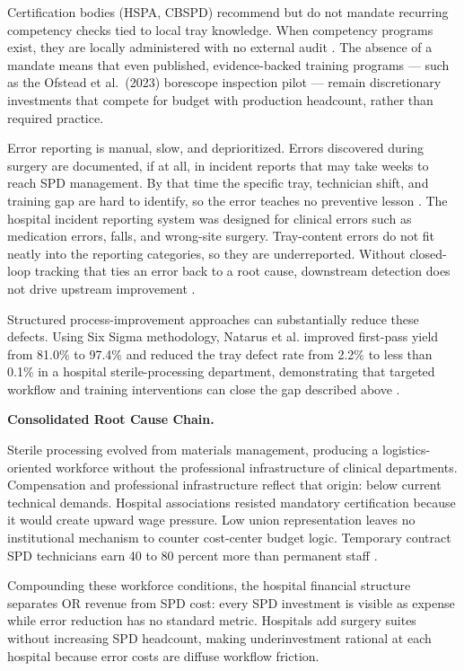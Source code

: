 \documentclass[10pt,a4paper]{article}
\begin{document}
Certification bodies (HSPA, CBSPD) recommend but do not mandate recurring
competency checks tied to local tray knowledge. When competency programs exist,
they are locally administered with no external audit
\cite{kovach-2012, ofstead-et-al-2023}.
The absence of a mandate means that even published, evidence-backed
training programs --- such as the Ofstead et al.\ (2023) borescope
inspection pilot --- remain discretionary investments that compete
for budget with production headcount, rather than required practice.

Error reporting is manual, slow, and deprioritized. Errors discovered during
surgery are documented, if at all, in incident reports that may take weeks to
reach SPD management. By that time the specific tray, technician shift, and
training gap are hard to identify, so the error teaches no preventive lesson
\cite{nichol-et-al-2024, zhu-et-al-2019}. The hospital incident reporting
system was designed for clinical errors such as medication errors, falls, and
wrong-site surgery. Tray-content errors do not fit neatly into the reporting
categories, so they are underreported. Without closed-loop tracking that ties an
error back to a root cause, downstream detection does not drive upstream
improvement \cite{nichol-et-al-2024, zhu-et-al-2019}.

Structured process-improvement approaches can substantially reduce these
defects. Using Six Sigma methodology, Natarus et al. improved first-pass yield
from 81.0\% to 97.4\% and reduced the tray defect rate from 2.2\% to less than
0.1\% in a hospital sterile-processing department, demonstrating that targeted
workflow and training interventions can close the gap described above
\cite{natarus-et-al-2025}.

\textbf{Consolidated Root Cause Chain.}

Sterile processing evolved from materials management, producing a logistics-oriented workforce without the professional infrastructure of clinical departments.
Compensation and professional infrastructure reflect that origin: below current technical demands.
Hospital associations resisted mandatory certification because it would create upward wage pressure.
Low union representation leaves no institutional mechanism to counter cost-center budget logic.
Temporary contract SPD technicians earn 40 to 80 percent more than permanent staff \cite{nadeau-2023-spd-salary-survey, specialtycare-travel-spd-2026}.

Compounding these workforce conditions, the hospital financial structure separates OR revenue from SPD cost: every SPD investment is visible as expense while error reduction has no standard metric.
Hospitals add surgery suites without increasing SPD headcount, making underinvestment rational at each hospital because error costs are diffuse workflow friction.
\end{document}
